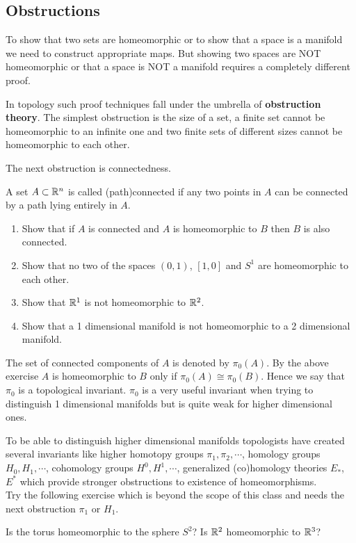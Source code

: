 	\subsection{Obstructions}
	To show that two sets are homeomorphic or to show that a space is a manifold we need to construct appropriate maps. But showing two spaces are {NOT} homeomorphic or that a space is {NOT} a manifold requires a completely different proof.

	In topology such proof techniques fall under the umbrella of \textbf{obstruction theory}. The simplest obstruction is the size of a set, a finite set cannot be homeomorphic to an infinite one and two finite sets of different sizes cannot be homeomorphic to each other.

	The next obstruction is connectedness.

	\begin{exercise}
		A set $A \subset \mathbb{R}^n$ is called (path)connected if any two points in $A$ can be connected by a path lying entirely in $A$.
		\begin{enumerate}
			\item Show that if $A$ is connected and $A$ is homeomorphic to $B$ then $B$ is also connected.
			\item Show that no two of the spaces $(0,1)$, $[1,0]$ and $S^1$ are homeomorphic to each other.
			\item Show that $\mathbb{R}^1$ is not homeomorphic to $\mathbb{R}^2$.
			\item Show that a 1 dimensional manifold is not homeomorphic to a 2 dimensional manifold.
		\end{enumerate}
	\end{exercise}
	The set of connected components of $A$ is denoted by $\pi_0(A)$. By the above exercise $A$ is homeomorphic to $B$ only if $\pi_0(A) \cong \pi_0(B)$. Hence we say that $\pi_0$ is a topological invariant. $\pi_0$ is a very useful invariant when trying to distinguish 1 dimensional manifolds but is quite weak for higher dimensional ones.

	To be able to distinguish higher dimensional manifolds topologists have created several invariants like higher homotopy groups $\pi_1, \pi_2, \cdots$,  homology groups $H_0, H_1, \cdots$,  cohomology groups $H^0, H^1, \cdots$, generalized (co)homology theories $E_*$, $E^*$ which provide stronger obstructions to existence of homeomorphisms.\\

	Try the following exercise which is beyond the scope of this class and needs the next obstruction $\pi_1$ or $H_1$.
	\begin{exercise}
		Is the torus homeomorphic to the sphere $S^2$? Is $\mathbb{R}^2$ homeomorphic to $\mathbb{R}^3$?
	\end{exercise}


